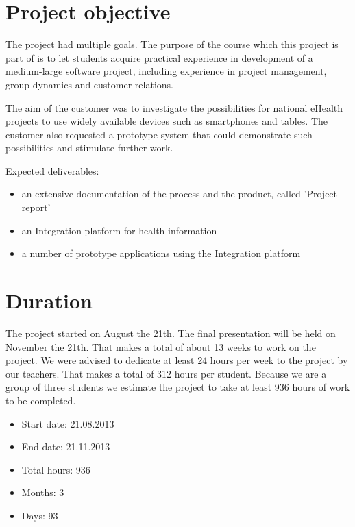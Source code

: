 
\section{Project objective}
\label{section:objective}

The project had multiple goals.
The purpose of the course which this project is part of is to let students acquire practical experience in development
of a medium-large software project, including experience in project management, group dynamics and customer relations.

The aim of the customer was to investigate the possibilities for national eHealth projects to use widely available
devices such as smartphones and tables. The customer also requested a prototype system that could demonstrate such
possibilities and stimulate further work.

Expected deliverables:
\begin{itemize}
\item an extensive documentation of the process and the product, called 'Project report'
\item an Integration platform for health information
\item a number of prototype applications using the Integration platform
\end{itemize}

\section{Duration}
\label{section:duration}
The project started on August the 21th. The final presentation will be held on November the 21th.
That makes a total of about 13 weeks to work on the project.
We were advised to dedicate at least 24 hours per week to the project by our teachers.
That makes a total of 312 hours per student. Because we are a group of three students we estimate
the project to take at least 936 hours of work to be completed.

\begin{itemize}
\item Start date: 21.08.2013
\item End date: 21.11.2013
\item Total hours: 936
\item Months: 3
\item Days: 93
\end{itemize}

